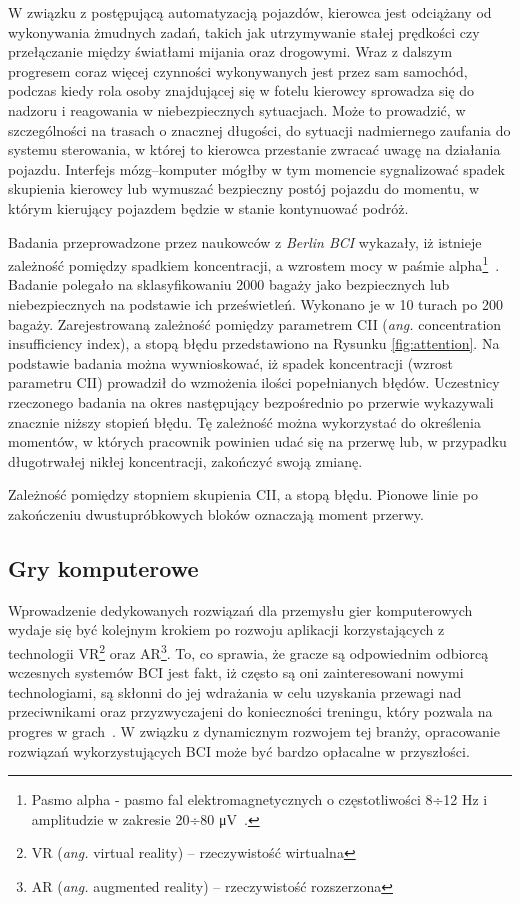 \documentclass[skorowidz,skroty]{dyplomWEZUT}
\begin{document}
W związku z postępującą automatyzacją pojazdów, kierowca jest odciążany od wykonywania żmudnych zadań, takich jak utrzymywanie stałej prędkości czy przełączanie między światłami mijania oraz drogowymi. Wraz z dalszym progresem coraz więcej czynności wykonywanych jest przez sam samochód, podczas kiedy rola osoby znajdującej się w fotelu kierowcy sprowadza się do nadzoru i reagowania w niebezpiecznych sytuacjach. Może to prowadzić, w szczególności na trasach o znacznej długości, do sytuacji nadmiernego zaufania do systemu sterowania, w której to kierowca przestanie zwracać uwagę na działania pojazdu. Interfejs mózg--komputer mógłby w tym momencie sygnalizować spadek skupienia kierowcy lub wymuszać bezpieczny postój pojazdu do momentu, w którym kierujący pojazdem będzie w stanie kontynuować podróż.

Badania przeprowadzone przez naukowców z \textit{Berlin BCI} wykazały, iż istnieje zależność pomiędzy spadkiem koncentracji, a wzrostem mocy w paśmie alpha\footnote{Pasmo alpha - pasmo fal elektromagnetycznych o częstotliwości 8÷12 Hz i amplitudzie w zakresie 20÷80 μV~\cite[str. 17]{bci_handbook}.}~\cite{bci_applications}. Badanie polegało na sklasyfikowaniu 2000 bagaży jako bezpiecznych lub niebezpiecznych na podstawie ich prześwietleń. Wykonano je w 10 turach po 200 bagaży. Zarejestrowaną zależność pomiędzy parametrem CII (\textit{ang.} concentration insufficiency index), a stopą błędu przedstawiono na Rysunku \vref{fig:attention}. Na podstawie badania można wywnioskować, iż spadek koncentracji (wzrost parametru CII) prowadził do wzmożenia ilości popełnianych błędów. Uczestnicy rzeczonego badania na okres następujący bezpośrednio po przerwie wykazywali znacznie niższy stopień błędu. Tę zależność można wykorzystać do określenia momentów, w których pracownik powinien udać się na przerwę lub, w przypadku długotrwałej nikłej koncentracji, zakończyć swoją zmianę.

{Zależność pomiędzy stopniem skupienia CII, a stopą błędu. Pionowe linie po zakończeniu dwustupróbkowych bloków oznaczają moment przerwy.\label{fig:attention}}
{\cite{bci_applications}}


\subsection{Gry komputerowe}
Wprowadzenie dedykowanych rozwiązań dla przemysłu gier komputerowych wydaje się być kolejnym krokiem po rozwoju aplikacji korzystających z technologii VR\footnote{VR (\textit{ang.} virtual reality) -- rzeczywistość wirtualna} oraz AR\footnote{AR (\textit{ang.} augmented reality) -- rzeczywistość rozszerzona}. To, co sprawia, że gracze są odpowiednim odbiorcą wczesnych systemów BCI jest fakt, iż często są oni zainteresowani nowymi technologiami, są skłonni do jej wdrażania w celu uzyskania przewagi nad przeciwnikami oraz przyzwyczajeni do konieczności treningu, który pozwala na progres w grach~\cite{bci_games_survey}. W związku z dynamicznym rozwojem tej branży, opracowanie rozwiązań wykorzystujących BCI może być bardzo opłacalne w przyszłości.
\end{document}
